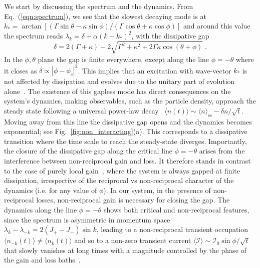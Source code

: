 \documentclass[floatfix,reprint,amsmath,amssymb,superscriptaddress,aps,prl]{revtex4-2}
\begin{document}
We start by discussing the spectrum and the dynamics. From Eq.~(\ref{eqn:spectrum}), we see that the slowest decaying mode is at $k_*=\arctan[\left(\Gamma\sin\theta-\kappa\sin\phi\right)/\left(\Gamma\cos\theta+\kappa\cos\phi\right)]$ and around this value the spectrum reads $\lambda_k=\delta+\alpha(k-k_*)^2$, with the dissipative gap
\begin{equation}
    \delta = 2 \left(\Gamma +\kappa\right)-2\sqrt{\Gamma^2+\kappa^2+2\Gamma\kappa\cos\left(\theta+\phi\right)}\;.
\end{equation}
In the $\phi,\theta$ plane the gap is finite everywhere, except along the line $\phi=-\theta$ where it closes as $\delta\propto|\phi-\phi_c|^2$. This implies that an excitation with wave-vector $k_*$ is not affected by dissipation and evolves due to the unitary part of evolution alone~\cite{supplementary_mat}. The existence of this gapless mode has direct consequences on the system's dynamics, making observables, such as the particle density, approach the steady state following a universal power-law decay~\cite{supplementary_mat} $\langle n(t)\rangle\sim \langle n\rangle_{\text{ss}}-\delta n/\sqrt{t}$. Moving away from this line the dissipative gap opens and the dynamics becomes exponential; see Fig.~\ref{fig:non_interacting}(a). This corresponds to a dissipative transition where the time scale to reach the steady-state diverges. Importantly, the closure of the dissipative gap along the critical line $\phi=-\theta$ arises from the interference between non-reciprocal gain and loss. It therefore stands in contrast to the case of purely local gain~\cite{Begg2024}, where the system is always gapped at finite dissipation, irrespective of the reciprocal vs non-reciprocal character of the dynamics (i.e. for any value of $\phi$). In our system, in the presence of non-reciprocal losses, non-reciprocal gain is necessary for closing the gap. The dynamics along the line $\phi=-\theta$ shows both critical and non-reciprocal features, since the spectrum is asymmetric in momentum space $\lambda_k-\lambda_{-k}= 2(J_+-J_-)\sin k$, leading to a non-reciprocal transient occupation $\langle n_{-k}(t)\rangle\neq \langle n_k(t)\rangle$ and so to a non-zero transient current $\langle \mathcal{I}\rangle\sim \mathcal{I}_0\sin\phi/\sqrt{t}$ that slowly vanishes at long times with a magnitude controlled by the phase of the gain and loss baths~\cite{supplementary_mat}.
\end{document}
